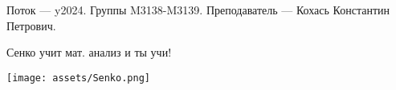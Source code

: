 Поток — y2024.\newline
Группы M3138-M3139.\newline
Преподаватель --- Кохась Константин Петрович.\par

Сенко учит мат. анализ и ты учи!
\begin{center}
   \texttt{[image: assets/Senko.png]}
\end{center}